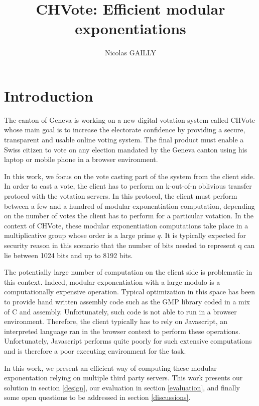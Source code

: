 \documentclass[]{article}
\title{CHVote: Efficient modular exponentiations}
\author{Nicolas GAILLY}
\begin{document}
\maketitle

\section{Introduction} \label{intro}

The canton of Geneva is working on a new digital votation system called
CHVote \cite{chvote} whose main goal is to increase the electorate confidence 
by providing a secure, transparent and usable online voting system. The final
product must enable a Swiss citizen to vote on any election mandated by the
Geneva canton using his laptop or mobile phone in a browser environment.

In this work, we focus on the vote casting part of the system from the client
side. In order to cast a vote, the client has to perform an k-out-of-n oblivious
transfer protocol \cite{chu2005} with the votation servers. In this protocol,
the client must perform between a few and a hundred of modular exponentiation
computation, depending on the number of votes the client has to perform for a
particular votation. In the context of CHVote, these modular exponentiation
computations take place in a multiplicative group whose order is a large prime
$q$. It is typically expected for security reason in this scenario that the number
of bits needed to represent q can lie between 1024 bits and up to 8192 bits.

The potentially large number of computation on the client side is problematic in
this context.  Indeed, modular exponentiation with a large modulo is a
computationally expensive operation. Typical optimization in this space has been
to provide hand written assembly code such as the GMP library \cite{gmplib}
coded in a mix of C and assembly. Unfortunately, such code is not able to run in
a browser environment. Therefore, the client typically has to rely on
Javascript, an interpreted language ran in the browser context to perform these
operations.  Unfortunately, Javascript performs quite poorly for such extensive
computations \cite{jsbad} and is therefore a poor executing environment for the
task.

In this work, we present an efficient way of computing these modular
exponentation relying on multiple third party servers. This work presents our solution
in section \ref{design}, our evaluation in section \ref{evaluation}, and finally some open
questions to be addressed in section \ref{discussions}.
\end{document}
